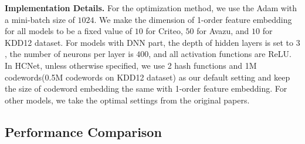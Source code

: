 \documentclass[sigconf,authorversion]{acmart}
\begin{document}
\textbf{Implementation Details.}
For the optimization method, we use the Adam\cite{adam} with a mini-batch size of $1024$.  We make the dimension of 1-order feature embedding for all models to be a fixed value of $10$ for Criteo,  $50$ for Avazu, and $10$ for KDD12 dataset.  For models with DNN part, the depth of hidden layers is set to $3$, the number of neurons per layer is $400$, and all activation functions are ReLU. In HCNet, unless otherwise specified, we use 2 hash functions and 1M codewords(0.5M codewords on KDD12 dataset) as our default setting and keep the size of codeword embedding the same with 1-order feature embedding. For other models, we take the optimal settings from the original papers.

\subsection{Performance Comparison}
\end{document}
